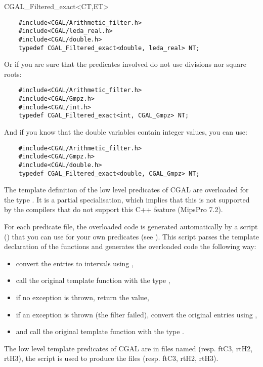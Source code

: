 \begin{ccClass} {CGAL_Filtered_exact<CT,ET>}
\begin{verbatim}
    #include<CGAL/Arithmetic_filter.h>
    #include<CGAL/leda_real.h>
    #include<CGAL/double.h>
    typedef CGAL_Filtered_exact<double, leda_real> NT;
\end{verbatim}

Or if you are sure that the predicates involved do not use divisions nor
square roots:

\begin{verbatim}
    #include<CGAL/Arithmetic_filter.h>
    #include<CGAL/Gmpz.h>
    #include<CGAL/int.h>
    typedef CGAL_Filtered_exact<int, CGAL_Gmpz> NT;
\end{verbatim}

And if you know that the double variables contain integer values, you can
use:

\begin{verbatim}
    #include<CGAL/Arithmetic_filter.h>
    #include<CGAL/Gmpz.h>
    #include<CGAL/double.h>
    typedef CGAL_Filtered_exact<double, CGAL_Gmpz> NT;
\end{verbatim}

\ccImplementation

The template definition of the low level predicates of CGAL are overloaded for
the type .  It is a partial specialisation,
which implies that this is not supported by the compilers that do not support
this C++ feature (MipsPro 7.2).

For each predicate file, the overloaded code is generated automatically by a
 script
() that you can
use for your own predicates (see ).
This script parses the template declaration of the functions and generates the
overloaded code the following way:
\begin{itemize}
\item convert the entries to intervals using
    ,
\item call the original template function with the type
    ,
\item if no exception is thrown, return the value,
\item if an exception is thrown (the filter failed), convert the original
    entries using ,
\item and call the original template function with the type .
\end{itemize}

\ccExample

The low level template predicates of CGAL are in files named
 (resp. ftC3, rtH2, rtH3), the script is used
to produce the files  (resp.
ftC3, rtH2, rtH3).

\end{ccClass}
